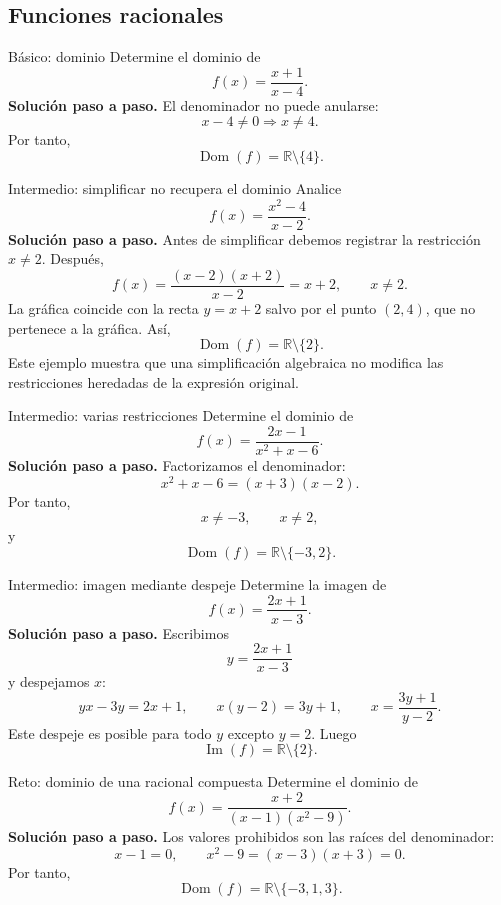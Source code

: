 \documentclass[aspectratio=169,10pt]{beamer}
\newcommand{\R}{\mathbb{R}}
\newcommand{\Dom}{\operatorname{Dom}}
\newcommand{\Ima}{\operatorname{Im}}
\begin{document}
\subsection{Funciones racionales}

\begin{frame}{Básico: dominio}
Determine el dominio de
\[
f(x)=\frac{x+1}{x-4}.
\]
\textbf{Solución paso a paso.} El denominador no puede anularse:
\[
x-4\neq0\Longrightarrow x\neq4.
\]
Por tanto,
\[
\boxed{\Dom(f)=\R\setminus\{4\}}.
\]
\end{frame}

\begin{frame}{Intermedio: simplificar no recupera el dominio}
Analice
\[
f(x)=\frac{x^2-4}{x-2}.
\]
\textbf{Solución paso a paso.} Antes de simplificar debemos registrar la restricción $x\neq2$. Después,
\[
f(x)=\frac{(x-2)(x+2)}{x-2}=x+2,\qquad x\neq2.
\]
La gráfica coincide con la recta $y=x+2$ salvo por el punto $(2,4)$, que no pertenece a la gráfica. Así,
\[
\boxed{\Dom(f)=\R\setminus\{2\}}.
\]
Este ejemplo muestra que una simplificación algebraica no modifica las restricciones heredadas de la expresión original.
\end{frame}

\begin{frame}{Intermedio: varias restricciones}
Determine el dominio de
\[
f(x)=\frac{2x-1}{x^2+x-6}.
\]
\textbf{Solución paso a paso.} Factorizamos el denominador:
\[
x^2+x-6=(x+3)(x-2).
\]
Por tanto,
\[
x\neq-3,\qquad x\neq2,
\]
y
\[
\boxed{\Dom(f)=\R\setminus\{-3,2\}}.
\]
\end{frame}

\begin{frame}{Intermedio: imagen mediante despeje}
Determine la imagen de
\[
f(x)=\frac{2x+1}{x-3}.
\]
\textbf{Solución paso a paso.} Escribimos
\[
y=\frac{2x+1}{x-3}
\]
y despejamos $x$:
\[
yx-3y=2x+1,
\qquad x(y-2)=3y+1,
\qquad x=\frac{3y+1}{y-2}.
\]
Este despeje es posible para todo $y$ excepto $y=2$. Luego
\[
\boxed{\Ima(f)=\R\setminus\{2\}}.
\]
\end{frame}

\begin{frame}{Reto: dominio de una racional compuesta}
Determine el dominio de
\[
f(x)=\frac{x+2}{(x-1)(x^2-9)}.
\]
\textbf{Solución paso a paso.} Los valores prohibidos son las raíces del denominador:
\[
x-1=0,\qquad x^2-9=(x-3)(x+3)=0.
\]
Por tanto,
\[
\boxed{\Dom(f)=\R\setminus\{-3,1,3\}}.
\]
\end{frame}
\end{document}
